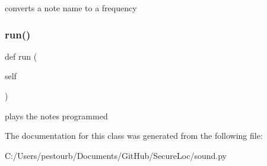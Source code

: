\begin{DoxyVerb}converts a note name to a frequency\end{DoxyVerb}
 \mbox{\label{classsound_1_1_melody_ad22709b2e67308af35f55680d5a026e0}} 
\subsubsection{\texorpdfstring{run()}{run()}}
{\footnotesize\ttfamily def run (\begin{DoxyParamCaption}\item[{}]{self }\end{DoxyParamCaption})}

\begin{DoxyVerb}plays the notes programmed\end{DoxyVerb}
 

The documentation for this class was generated from the following file\+:\begin{DoxyCompactItemize}
\item 
C\+:/\+Users/pestourb/\+Documents/\+Git\+Hub/\+Secure\+Loc/sound.\+py\end{DoxyCompactItemize}
